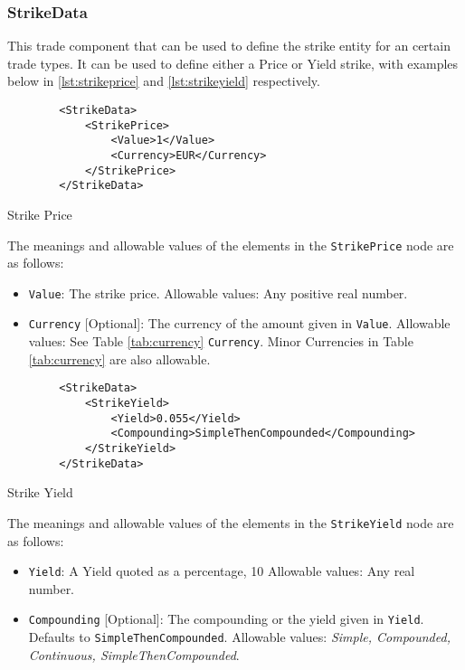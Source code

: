 \subsubsection{StrikeData}
\label{ss:strikedata}

This trade component that can be used to define the strike entity for an certain trade types. It can be used to define either a Price or Yield strike, with examples below in  \ref{lst:strikeprice} and \ref{lst:strikeyield} respectively.

\begin{listing}[H]
\begin{verbatim}
        <StrikeData>
			<StrikePrice>
				<Value>1</Value>
				<Currency>EUR</Currency>
			</StrikePrice>
		</StrikeData>
\end{verbatim}
\caption{Strike Price}
\label{lst:strikeprice}
\end{listing}

The meanings and allowable values of the elements in the \lstinline!StrikePrice! node are as follows:

\begin{itemize}

\item \lstinline!Value!: The strike price.
Allowable values: Any positive real number.

\item \lstinline!Currency! [Optional]: The currency of the amount given in \lstinline!Value!.
Allowable values: See Table \ref{tab:currency} \lstinline!Currency!. Minor Currencies in Table \ref{tab:currency} are also allowable.

\end{itemize}

\begin{listing}[H]
\begin{verbatim}
        <StrikeData>
			<StrikeYield>
				<Yield>0.055</Yield>
				<Compounding>SimpleThenCompounded</Compounding>
			</StrikeYield>
		</StrikeData>
\end{verbatim}
\caption{Strike Yield}
\label{lst:strikeyield}
\end{listing}

The meanings and allowable values of the elements in the \lstinline!StrikeYield! node are as follows:

\begin{itemize}

\item \lstinline!Yield!: A Yield quoted as a percentage, 10%
Allowable values: Any real number.

\item \lstinline!Compounding! [Optional]: The compounding or the yield given in  \lstinline!Yield!. Defaults to \lstinline!SimpleThenCompounded!.
Allowable values: {\em Simple, Compounded, Continuous, SimpleThenCompounded}.

\end{itemize}
